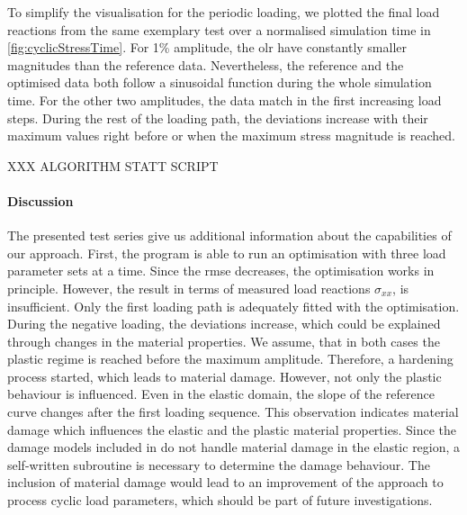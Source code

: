 To simplify the visualisation for the periodic loading, we plotted the final load reactions from the same exemplary test over a normalised simulation time in \autoref{fig:cyclicStressTime}. For 1\% amplitude, the \acrlong{olr} have constantly smaller magnitudes than the reference data.
Nevertheless, the reference and the optimised data both follow a sinusoidal function during the whole simulation time.  For the other two amplitudes, the data match in the first increasing load steps. During the rest of the loading path, the deviations increase with their maximum values right before or when the maximum stress magnitude is reached. 

XXX ALGORITHM STATT SCRIPT
\paragraph{Discussion}
The presented test series give us additional information about the capabilities of our approach. First, the program is able to run an optimisation with three load parameter sets at a time. Since the \acrshort{rmse} decreases, the optimisation works in principle.
However, the result in terms of measured load reactions $\sigma_{xx}$, is insufficient.
Only the first loading path is adequately fitted with the optimisation.
During the negative loading, the deviations increase, which could be explained through changes in the material properties.
We assume, that in both cases the plastic regime is reached before the maximum amplitude. Therefore, a hardening process started, which leads to material damage. However, not only the plastic behaviour is influenced. Even in the elastic domain, the slope of the reference curve changes after the first loading sequence. This observation indicates material damage which influences the elastic and the plastic material properties. Since the damage models included in  do not handle material damage in the elastic region, a self-written subroutine is necessary to determine the damage behaviour. The inclusion of material damage would lead to an improvement of the approach to process cyclic load parameters, which should be part of future investigations. 










